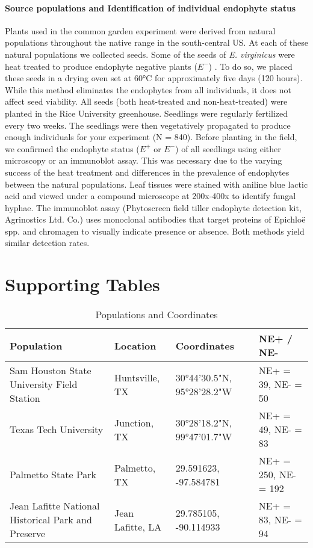 \documentclass[12pt]{article}\usepackage[]{graphicx}\usepackage[dvipsnames]{xcolor}
\begin{document}
\paragraph {Source populations and Identification of individual endophyte status} 
Plants used  in the common garden experiment were derived from natural populations throughout the native range in the south-central US. 
At each of these natural populations we collected seeds. 
Some of the seeds of \emph{E. virginicus} were heat treated to produce endophyte negative plants ($E^-$) . 
To do so, we placed these seeds  in a drying oven set at 60°C for approximately five days (120 hours). 
While this method eliminates the endophytes from all individuals, it does not affect seed viability. 
All seeds (both heat-treated and non-heat-treated) were planted in the Rice University greenhouse.
Seedlings were regularly fertilized every two weeks. 
The seedlings were then vegetatively propagated to produce enough individuals for your experiment (N = 840).
Before planting in the field, we confirmed the endophyte status ($E^+$ or $E^-$) of all  seedlings using either microscopy or an immunoblot assay. 
This was necessary due to the varying success of the heat treatment and differences in the prevalence of endophytes between the natural populations. 
Leaf tissues were stained with aniline blue lactic acid and viewed under a compound microscope at 200x-400x to identify fungal hyphae. 
The immunoblot assay (Phytoscreen field tiller endophyte detection kit, Agrinostics Ltd. Co.) uses monoclonal antibodies that target proteins of Epichloë spp. and chromagen to visually indicate presence or absence. Both methods yield similar detection rates.  


\section {Supporting Tables}

\begin{table}[H]
\centering
\caption{Populations and Coordinates}
\begin{tabular}{|p{2in}|l|l|l|}
\hline
\textbf{Population} & \textbf{Location} & \textbf{Coordinates} & \textbf{NE+ / NE-} \\ \hline
Sam Houston State University Field Station  & Huntsville, TX & 30°44'30.5"N, 95°28'28.2"W & NE+ = 39, NE- = 50 \\ \hline
Texas Tech University  & Junction, TX & 30°28'18.2"N, 99°47'01.7"W & NE+ = 49, NE- = 83 \\ \hline
Palmetto State Park  & Palmetto, TX & 29.591623, -97.584781 & NE+ = 250, NE- = 192 \\ \hline
Jean Lafitte National Historical Park and Preserve  & Jean Lafitte, LA & 29.785105, -90.114933 & NE+ = 83, NE- = 94 \\ \hline
\end{tabular}
\end{table}
\end{document}
